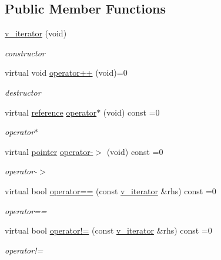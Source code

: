 \subsection*{Public Member Functions}
\begin{DoxyCompactItemize}
\item 
\mbox{\hyperlink{group___thin_var_dep_interface___c_l_a_s_s_e_s_ga9cd58d13e7890847374b00c665cda7e5}{v\+\_\+iterator}} (void)
\begin{DoxyCompactList}\small\item\em constructor \end{DoxyCompactList}\item 
virtual void \mbox{\hyperlink{group___thin_var_dep_interface___c_l_a_s_s_e_s_ga79fc9d17094dc591d6b48bc296028d51}{operator++}} (void)=0
\begin{DoxyCompactList}\small\item\em destructor \end{DoxyCompactList}\item 
virtual \mbox{\hyperlink{class_s_m_spp__di__unipi__it_1_1_variable}{reference}} \mbox{\hyperlink{group___thin_var_dep_interface___c_l_a_s_s_e_s_gabce2a2d16159da29402d5561d6e0e28c}{operator$\ast$}} (void) const =0
\begin{DoxyCompactList}\small\item\em operator$\ast$ \end{DoxyCompactList}\item 
virtual \mbox{\hyperlink{class_s_m_spp__di__unipi__it_1_1_variable}{pointer}} \mbox{\hyperlink{group___thin_var_dep_interface___c_l_a_s_s_e_s_gab6b157ee55dad2dd8215f31aafbdd35f}{operator-\/$>$}} (void) const =0
\begin{DoxyCompactList}\small\item\em operator-\/$>$ \end{DoxyCompactList}\item 
virtual bool \mbox{\hyperlink{group___thin_var_dep_interface___c_l_a_s_s_e_s_ga165c06b6e2a096f5e53417077791cacb}{operator==}} (const \mbox{\hyperlink{class_s_m_spp__di__unipi__it_1_1_thin_var_dep_interface_1_1v__iterator}{v\+\_\+iterator}} \&rhs) const =0
\begin{DoxyCompactList}\small\item\em operator== \end{DoxyCompactList}\item 
virtual bool \mbox{\hyperlink{group___thin_var_dep_interface___c_l_a_s_s_e_s_ga65d7322ccac278cb028219cbedcd0494}{operator!=}} (const \mbox{\hyperlink{class_s_m_spp__di__unipi__it_1_1_thin_var_dep_interface_1_1v__iterator}{v\+\_\+iterator}} \&rhs) const =0
\begin{DoxyCompactList}\small\item\em operator!= \end{DoxyCompactList}\end{DoxyCompactItemize}


